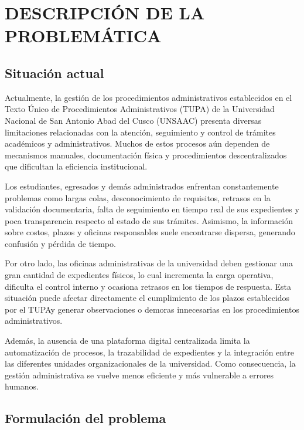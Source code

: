 \newpage
\chapter{DESCRIPCIÓN DE LA PROBLEMÁTICA}

\section{Situación actual}

Actualmente, la gestión de los procedimientos administrativos establecidos en el Texto Único de Procedimientos Administrativos (TUPA) de la Universidad Nacional de San Antonio Abad del Cusco (UNSAAC) presenta diversas limitaciones relacionadas con la atención, seguimiento y control de trámites académicos y administrativos. Muchos de estos procesos aún dependen de mecanismos manuales, documentación física y procedimientos descentralizados que dificultan la eficiencia institucional.

Los estudiantes, egresados y demás administrados enfrentan constantemente problemas como largas colas, desconocimiento de requisitos, retrasos en la validación documentaria, falta de seguimiento en tiempo real de sus expedientes y poca transparencia respecto al estado de sus trámites. Asimismo, la información sobre costos, plazos y oficinas responsables suele encontrarse dispersa, generando confusión y pérdida de tiempo.

\vspace{0.3cm}

Por otro lado, las oficinas administrativas de la universidad deben gestionar una gran cantidad de expedientes físicos, lo cual incrementa la carga operativa, dificulta el control interno y ocasiona retrasos en los tiempos de respuesta. Esta situación puede afectar directamente el cumplimiento de los plazos establecidos por el TUPA\@ y generar observaciones o demoras innecesarias en los procedimientos administrativos.

Además, la ausencia de una plataforma digital centralizada limita la automatización de procesos, la trazabilidad de expedientes y la integración entre las diferentes unidades organizacionales de la universidad. Como consecuencia, la gestión administrativa se vuelve menos eficiente y más vulnerable a errores humanos.

\section{Formulación del problema}


